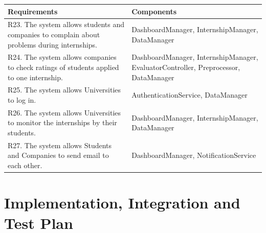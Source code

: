 \documentclass{article}
\begin{document}
\newpage

\begin{table}[H]
    \centering
    \begin{tabular}{|p{}|p{}|}
        \hline
         \textbf{Requirements} & \textbf{Components} \\
         \hline
        R23. The system allows students and companies to complain about problems
        during internships.\newline
         &
        DashboardManager, \newline
        InternshipManager,\newline
        DataManager\\

        \hline
        R24. The system allows companies to check ratings of students applied to
        one internship.\newline
         &
        DashboardManager, \newline
        InternshipManager,\newline
        EvaluatorController,\newline
        Preprocessor,\newline
        DataManager\\
        \hline
        R25. The system allows Universities to log in.\newline
         &
        AuthenticationService, \newline
        DataManager\\
        \hline
        R26. The system allows Universities to monitor the internships by their
        students.\newline
         &
        DashboardManager, \newline
        InternshipManager,\newline
        DataManager\\
        \hline
        R27. The system allows Students and Companies to send email to each
        other.\newline
         &
        DashboardManager, \newline
        NotificationService\\
        \hline
    \end{tabular}
\end{table}


\newpage

\section{Implementation, Integration and Test Plan}
\end{document}
